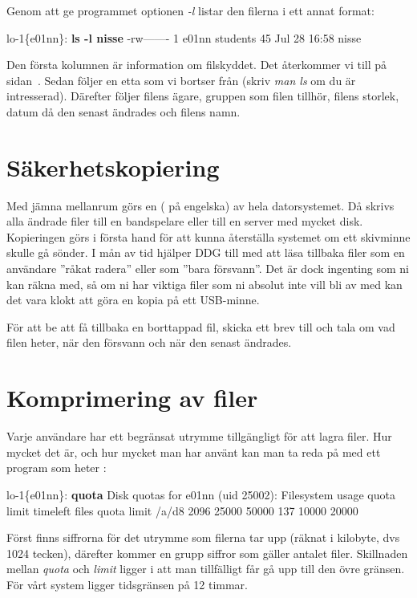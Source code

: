 \documentclass[a4paper,twocolumn]{book}
\begin{document}
Genom att ge programmet  optionen
\emph{-l} listar den filerna i ett annat format:
\begin{example}
\scriptsize
lo-1\{e01nn\}: \textbf{ls -l nisse}
-rw-------   1 e01nn  students  45  Jul 28 16:58 nisse
\end{example}
Den första kolumnen är information om filskyddet. Det återkommer vi
till på sidan~\pageref{sec:filskydd}. Sedan följer en etta som vi
bortser från (skriv \emph{man ls} om du är intresserad). Därefter
följer filens ägare, gruppen som filen tillhör, filens storlek, datum
då den senast ändrades och filens namn.

\section{Säkerhetskopiering}

Med jämna mellanrum görs en 
( på engelska) av hela datorsystemet. Då skrivs alla
ändrade filer till en bandspelare eller till en server med mycket disk.
Kopieringen görs i första hand för
att kunna återställa systemet om ett skivminne skulle gå sönder. I mån
av tid hjälper DDG till med att läsa tillbaka filer som en användare
''råkat radera'' eller som ''bara försvann''. Det är dock ingenting
som ni kan räkna med, så om ni har viktiga filer som ni absolut inte
vill bli av med kan det vara klokt att göra en kopia på ett USB-minne.

För att be att få tillbaka en borttappad fil, skicka ett brev till 
 och tala om vad filen heter, när den försvann och
när den senast ändrades.

\section{Komprimering av filer}

Varje användare har ett begränsat utrymme tillgängligt för att lagra
filer. Hur mycket det är, och hur mycket man har använt kan man ta
reda på med ett program som heter :
\begin{example}
\scriptsize
lo-1\{e01nn\}: \textbf{quota}
Disk quotas for e01nn (uid 25002): 
Filesystem usage quota limit timeleft files quota limit
/a/d8       2096 25000 50000            137 10000 20000            
\end{example}
Först finns siffrorna för det utrymme som filerna tar upp (räknat i
kilobyte, dvs 1024 tecken), därefter kommer en grupp siffror som
gäller antalet filer. Skillnaden mellan \emph{quota} och \emph{limit}
ligger i att man tillfälligt får gå upp till den övre gränsen. För
vårt system ligger tidsgränsen på 12 timmar.
\end{document}
